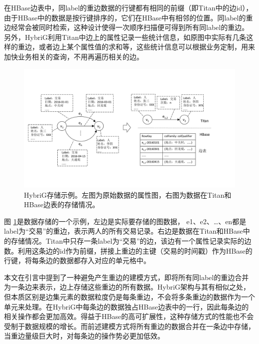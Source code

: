 在HBase边表中，同label的重边数据的行键都有相同的前缀（即Titan中的边id），由于HBase中的数据是按行键排序的，它们在HBase中有相邻的位置。同label的重边经常会被同时检索，这种设计使得一次顺序扫描便可得到所有同label的重边。另外，HybriG利用Titan中边上的属性记录一些统计信息，如原图中实际有几条这样的重边，或者边上某个属性值的求和等，这些统计信息可以根据业务定制，用来加快业务相关的查询，不用再遍历相关的边。

\begin{figure}[htbp]
\centering
\includegraphics[width=150mm]{fig/storage_layer.pdf}
\caption[HybriG存储示例]{HybriG存储示例。左图为原始数据的属性图，右图为数据在Titan和HBase边表的存储情况。}
\label{fig:storage_layer}
\end{figure}

图 \ref{fig:storage_layer}是数据存储的一个示例，左边是实际要存储的图数据， e1、e2、…、en都是label为“交易”的重边，表示两人的所有交易记录。右边是数据在Titan和HBase中的存储情况。Titan中只存一条label为“交易”的边，该边有一个属性记录实际的边数。利用这条边的id作为前缀，拼接上重边的主键（交易的时间戳）作为HBase的行键，将每条边的数据都存入对应的单元格中。

本文在引言中提到了一种避免产生重边的建模方式，即将所有同label的重边合并为一条边来表示，边上存储这些重边的所有数据。HybriG架构与其有相似之处，但本质区别是边集元素的数据粒度仍是每条重边，不会将多条重边的数据作为一个单元来处理。在HybriG中每条边的数据独占HBase边表中的一行，因此每条边的相关操作都会更加高效。得益于HBase的高可扩展性，这种存储方式的性能也不会受制于数据规模的增长。而前述建模方式将所有重边的数据合并在一条边中存储，当重边量级巨大时，对每条边的操作势必更加低效。

